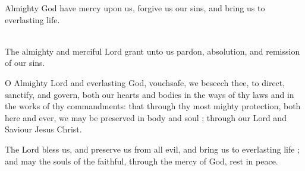 Almighty God have mercy upon us, forgive us our sins, and bring us to everlasting life.\\

\\
The almighty and merciful Lord grant unto us pardon, absolution, and remission of our sins.\\


O Almighty Lord and everlasting God, vouchsafe, we beseech thee, to direct,
sanctify, and govern, both our hearts and bodies in the ways of thy laws and in
the works of thy commandments: that through thy most mighty protection, both here and ever,
we may be preserved in body and soul ; through our Lord and Saviour Jesus Christ.\\


The Lord bless us, and preserve us from all evil, and bring us to everlasting life ;
and may the souls of the faithful, through the mercy of God, rest in peace.\\


\clearpage
